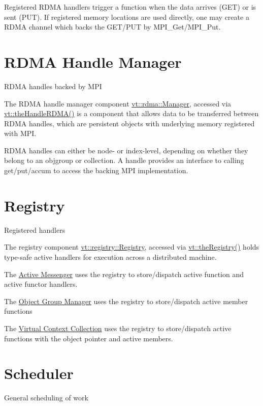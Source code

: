 Registered R\+D\+MA handlers trigger a function when the data arrives (G\+ET) or is sent (P\+UT). If registered memory locations are used directly, one may create a R\+D\+MA channel which backs the G\+E\+T/\+P\+UT by {\ttfamily M\+P\+I\+\_\+\+Get}/{\ttfamily M\+P\+I\+\_\+\+Put}. \hypertarget{rdmahandle}{}\section{R\+D\+MA Handle Manager}\label{rdmahandle}
R\+D\+MA handles backed by M\+PI

The R\+D\+MA handle manager component {\ttfamily \hyperlink{structvt_1_1rdma_1_1_manager}{vt\+::rdma\+::\+Manager}}, accessed via {\ttfamily \hyperlink{namespacevt_aecb87ec2c40b5b7fc57ba4cf8ea838b0}{vt\+::the\+Handle\+R\+D\+M\+A()}} is a component that allows data to be transferred between R\+D\+MA handles, which are persistent objects with underlying memory registered with M\+PI.

R\+D\+MA handles can either be node-\/ or index-\/level, depending on whether they belong to an objgroup or collection. A handle provides an interface to calling get/put/accum to access the backing M\+PI implementation. \hypertarget{registry}{}\section{Registry}\label{registry}
Registered handlers

The registry component {\ttfamily \hyperlink{structvt_1_1registry_1_1_registry}{vt\+::registry\+::\+Registry}}, accessed via {\ttfamily \hyperlink{namespacevt_a8b5994a5aedabc64006ce820db2e938c}{vt\+::the\+Registry()}} holds type-\/safe active handlers for execution across a distributed machine.


\begin{DoxyItemize}
\item The \hyperlink{active-messenger}{Active Messenger} uses the registry to store/dispatch active function and active functor handlers.
\item The \hyperlink{objgroup}{Object Group Manager} uses the registry to store/dispatch active member functions
\item The \hyperlink{collection}{Virtual Context Collection} uses the registry to store/dispatch active functions with the object pointer and active members. 
\end{DoxyItemize}\hypertarget{scheduler}{}\section{Scheduler}\label{scheduler}
General scheduling of work

